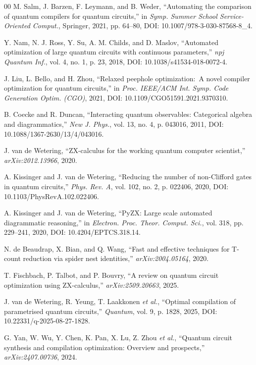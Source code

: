 \documentclass{ieeeaccess}
\begin{document}
\begin{thebibliography}{00}
 M. Salm, J. Barzen, F. Leymann, and B. Weder, ``Automating the comparison of quantum compilers for quantum circuits,'' in \emph{Symp. Summer School Service-Oriented Comput.}, Springer, 2021, pp. 64--80, DOI: 10.1007/978-3-030-87568-8\_4.

 Y. Nam, N. J. Ross, Y. Su, A. M. Childs, and D. Maslov, ``Automated optimization of large quantum circuits with continuous parameters,'' \emph{npj Quantum Inf.}, vol. 4, no. 1, p. 23, 2018, DOI: 10.1038/s41534-018-0072-4.

 J. Liu, L. Bello, and H. Zhou, ``Relaxed peephole optimization:\ A novel compiler optimization for quantum circuits,'' in \emph{Proc. IEEE/ACM Int. Symp. Code Generation Optim. (CGO)}, 2021, DOI: 10.1109/CGO51591.2021.9370310.

 B. Coecke and R. Duncan, ``Interacting quantum observables: Categorical algebra and diagrammatics,'' \emph{New J. Phys.}, vol. 13, no. 4, p. 043016, 2011, DOI: 10.1088/1367-2630/13/4/043016.

 J. van de Wetering, ``ZX-calculus for the working quantum computer scientist,'' \emph{arXiv:2012.13966}, 2020.

 A. Kissinger and J. van de Wetering, ``Reducing the number of non-Clifford gates in quantum circuits,'' \emph{Phys. Rev. A}, vol. 102, no. 2, p. 022406, 2020, DOI: 10.1103/PhysRevA.102.022406.

 A. Kissinger and J. van de Wetering, ``PyZX: Large scale automated diagrammatic reasoning,'' in \emph{Electron. Proc. Theor. Comput. Sci.}, vol. 318, pp. 229--241, 2020, DOI: 10.4204/EPTCS.318.14.

 N. de Beaudrap, X. Bian, and Q. Wang, ``Fast and effective techniques for T-count reduction via spider nest identities,'' \emph{arXiv:2004.05164}, 2020.

 T. Fischbach, P. Talbot, and P. Bouvry, ``A review on quantum circuit optimization using ZX-calculus,'' \emph{arXiv:2509.20663}, 2025.

 J. van de Wetering, R. Yeung, T. Laakkonen \emph{et al.}, ``Optimal compilation of parametrised quantum circuits,'' \emph{Quantum}, vol. 9, p. 1828, 2025, DOI: 10.22331/q-2025-08-27-1828.

 G. Yan, W. Wu, Y. Chen, K. Pan, X. Lu, Z. Zhou \emph{et al.}, ``Quantum circuit synthesis and compilation optimization: Overview and prospects,'' \emph{arXiv:2407.00736}, 2024.


\end{thebibliography}
\end{document}
